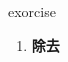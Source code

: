 
\begin{frame}
{\huge exorcise}
\begin{center}
\begin{enumerate}\Large
  \item \textbf{除去}
\end{enumerate}
\end{center}
\end{frame}
